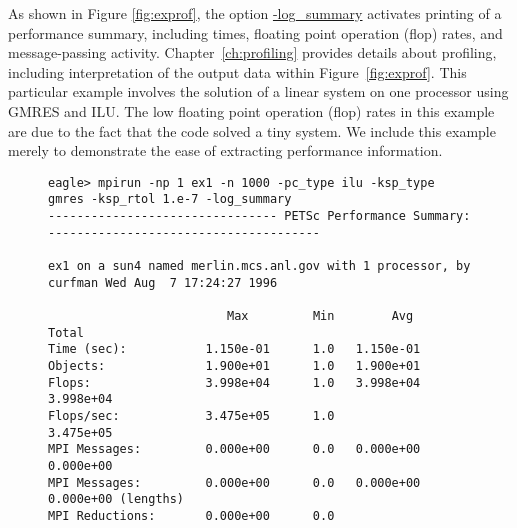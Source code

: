 As shown in Figure \ref{fig:exprof}, the option \url{
-log_summary} activates printing of a performance summary, including
times, floating point operation (flop) rates, and message-passing
activity.  Chapter~\ref{ch:profiling}
provides details about profiling, including interpretation of the
output data within Figure~\ref{fig:exprof}.  This particular example involves the solution of a linear
system on one processor using GMRES and ILU.  The low floating point
operation (flop) rates in this example are due to the fact that the
code solved a tiny system.  We include this example merely to
demonstrate the ease of extracting performance information.

\begin{figure}[H]
{\footnotesize
\begin{verbatim}
eagle> mpirun -np 1 ex1 -n 1000 -pc_type ilu -ksp_type gmres -ksp_rtol 1.e-7 -log_summary
-------------------------------- PETSc Performance Summary: --------------------------------------

ex1 on a sun4 named merlin.mcs.anl.gov with 1 processor, by curfman Wed Aug  7 17:24:27 1996

                         Max         Min        Avg        Total 
Time (sec):           1.150e-01      1.0   1.150e-01
Objects:              1.900e+01      1.0   1.900e+01
Flops:                3.998e+04      1.0   3.998e+04  3.998e+04
Flops/sec:            3.475e+05      1.0              3.475e+05
MPI Messages:         0.000e+00      0.0   0.000e+00  0.000e+00
MPI Messages:         0.000e+00      0.0   0.000e+00  0.000e+00 (lengths)
MPI Reductions:       0.000e+00      0.0


\end{verbatim}}
\end{figure}
